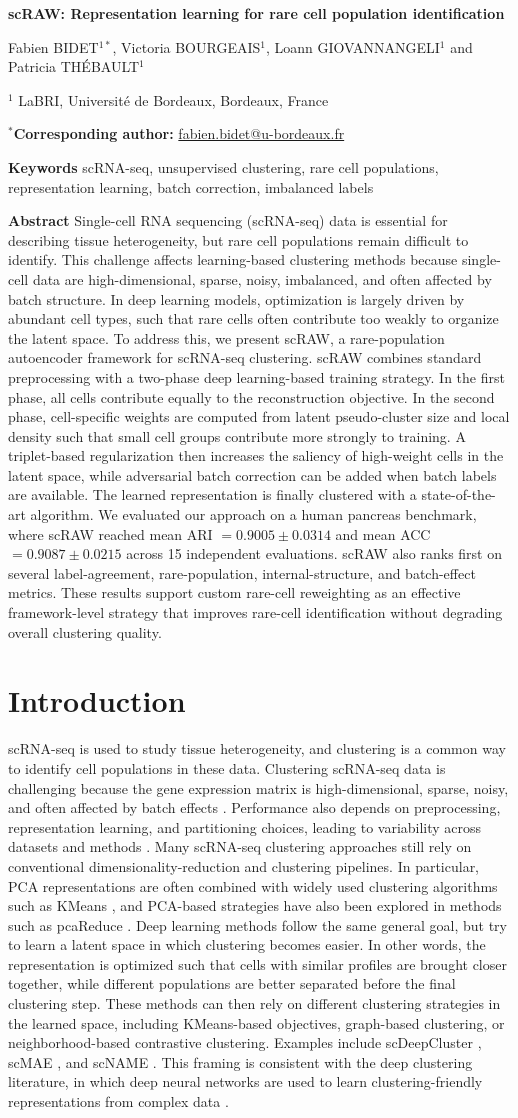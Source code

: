 \documentclass[11pt,a4paper]{article}
\makeatletter
\newcommand{\papertitle}{scRAW: Representation learning for rare cell population identification}
\newcommand{\paperauthors}{Fabien BIDET$^{1*}$, Victoria BOURGEAIS$^{1}$, Loann GIOVANNANGELI$^{1}$ and Patricia THÉBAULT$^{1}$}
\newcommand{\paperaffiliationone}{$^{1}$ LaBRI, Université de Bordeaux, Bordeaux, France}
\newcommand{\papercorresponding}{$^{*}$\textbf{Corresponding author:} \href{mailto:fabien.bidet@u-bordeaux.fr}{fabien.bidet@u-bordeaux.fr}}
\newcommand{\paperkeywords}{scRNA-seq, unsupervised clustering, rare cell populations, representation learning, batch correction, imbalanced labels}
\newcommand{\paperabstract}{Single-cell RNA sequencing (scRNA-seq) data is essential for
describing tissue heterogeneity, but rare cell populations remain difficult to identify. This challenge affects
learning-based clustering methods because single-cell data are
high-dimensional, sparse, noisy, imbalanced, and often affected by
batch structure. In deep learning models, optimization is largely driven by
abundant cell types, such that rare cells often contribute too
weakly to organize the latent space. To address this, we present scRAW, a
rare-population autoencoder framework for scRNA-seq clustering. scRAW
combines standard preprocessing with a two-phase deep learning-based
training strategy. In the first phase, all cells contribute equally to the
reconstruction objective. In the second phase, cell-specific weights
are computed from latent pseudo-cluster size and local density such
that small cell groups contribute more strongly to training. A
triplet-based regularization then increases the saliency of
high-weight cells in the latent space, while adversarial batch correction
can be added when batch labels are available. The learned
representation is finally clustered with a state-of-the-art algorithm. We evaluated our approach on a human pancreas benchmark, where scRAW reached mean ARI
$=0.9005 \pm 0.0314$ and mean ACC $=0.9087 \pm 0.0215$ across 15
independent evaluations. scRAW also ranks first on several label-agreement, rare-population, internal-structure, and batch-effect metrics. These results support custom rare-cell reweighting as an effective framework-level strategy that improves rare-cell identification without degrading overall clustering quality.}
\makeatother
\begin{document}
\pagestyle{plain}

\begin{flushleft}
{\Large\bfseries \papertitle\par}
\vspace{0.7em}
\paperauthors\par
\vspace{0.4em}
\paperaffiliationone\par
\vspace{0.6em}
\papercorresponding\par
\vspace{0.8em}
\textbf{Keywords} \paperkeywords\par
\vspace{0.4em}
\textbf{Abstract} \paperabstract
\end{flushleft}

\section{Introduction}
scRNA-seq is used to study tissue heterogeneity, and clustering is a common way to identify cell populations in these data. Clustering scRNA-seq data is challenging because the gene expression matrix is high-dimensional, sparse, noisy, and often affected by batch effects \cite{tran2020}. Performance also depends on preprocessing, representation learning, and partitioning choices, leading to variability across datasets and methods \cite{kiselev2019,luecken2019,duo2018,freytag2018}. Many scRNA-seq clustering approaches still rely on conventional dimensionality-reduction and clustering pipelines. In particular, PCA representations are often combined with widely used clustering algorithms such as KMeans \cite{macqueen1967}, and PCA-based strategies have also been explored in methods such as pcaReduce \cite{zurauskiene2016}. Deep learning methods \cite{ren2022} follow the same general goal, but try to learn a latent space in which clustering becomes easier. In other words, the representation is optimized such that cells with similar profiles are brought closer together, while different populations are better separated before the final clustering step. These methods can then rely on different clustering strategies in the learned space, including KMeans-based objectives, graph-based clustering, or neighborhood-based contrastive clustering. Examples include scDeepCluster \cite{tian2019}, scMAE \cite{fang2024}, and scNAME \cite{wan2022}. This framing is consistent with the deep clustering literature, in which deep neural networks are used to learn clustering-friendly representations from complex data \cite{ren2022}.
\end{document}
